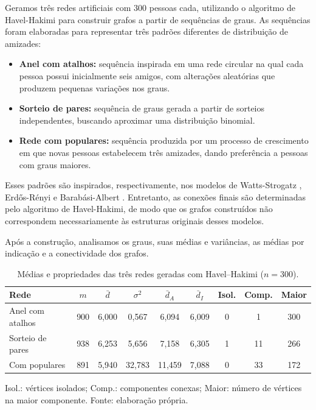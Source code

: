 \documentclass[12pt,a4paper]{article}
\theoremstyle{plain}
\theoremstyle{definition}
\theoremstyle{remark}
\begin{document}
Geramos três redes artificiais com 300 pessoas cada,
utilizando o algoritmo de Havel-Hakimi para construir
grafos a partir de sequências de graus. As sequências
foram elaboradas para representar três padrões diferentes
de distribuição de amizades:

\begin{itemize}
    \item \textbf{Anel com atalhos:} sequência inspirada
    em uma rede circular na qual cada pessoa possui
    inicialmente seis amigos, com alterações aleatórias
    que produzem pequenas variações nos graus.

    \item \textbf{Sorteio de pares:} sequência de graus
    gerada a partir de sorteios independentes, buscando
    aproximar uma distribuição binomial.

    \item \textbf{Rede com populares:} sequência produzida
    por um processo de crescimento em que novas pessoas
    estabelecem três amizades, dando preferência a pessoas
    com graus maiores.
\end{itemize}

Esses padrões são inspirados, respectivamente, nos modelos
de Watts-Strogatz \cite{ws}, Erdős-Rényi \cite{er} e
Barabási-Albert \cite{ba}. Entretanto, as conexões finais
são determinadas pelo algoritmo de Havel-Hakimi, de modo
que os grafos construídos não correspondem necessariamente
às estruturas originais desses modelos.

Após a construção, analisamos os graus, suas médias e
variâncias, as médias por indicação e a conectividade
dos grafos.


\begin{table}[htbp]
\centering
\caption{Médias e propriedades das três redes geradas
com Havel--Hakimi ($n=300$).}
\label{tab:redes}
\begin{tabular}{lcccccccc}
\toprule
Rede & $m$ & $\bar d$ & $\sigma^2$ & $\bar d_A$
& $\bar d_I$ & Isol. & Comp. & Maior \\
\midrule
Anel com atalhos
& 900 & 6,000 & 0,567 & 6,094 & 6,009
& 0 & 1 & 300 \\
Sorteio de pares
& 938 & 6,253 & 5,656 & 7,158 & 6,305
& 1 & 11 & 266 \\
Com populares
& 891 & 5,940 & 32,783 & 11,459 & 7,088
& 0 & 33 & 172 \\
\bottomrule
\end{tabular}

\smallskip
{\footnotesize
Isol.: vértices isolados;
Comp.: componentes conexas;
Maior: número de vértices na maior componente.
Fonte: elaboração própria.}
\end{table}
\end{document}
